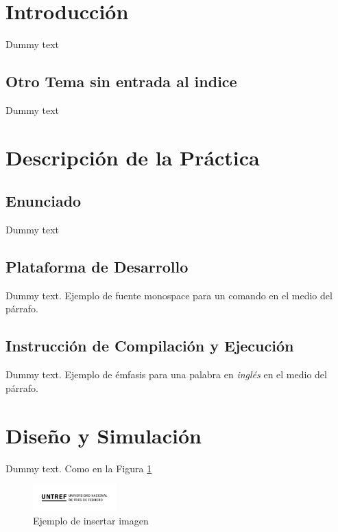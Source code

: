 \documentclass{article}
\begin{document}
\section{Introducción}
Dummy text

\subsection*{Otro Tema sin entrada al indice}
Dummy text

\section{Descripción de la Práctica}

\subsection{Enunciado}
Dummy text

\subsection{Plataforma de Desarrollo}
Dummy text. Ejemplo de fuente monospace {\ttfamily para un comando} en el medio del párrafo.

\subsection{Instrucción de Compilación y Ejecución}
Dummy text. Ejemplo de émfasis para una palabra en \textit{inglés} en el medio del párrafo.

\section{Diseño y Simulación}
Dummy text. Como en la Figura \ref{ejemplo-imagen}

\begin{figure}[h]
    \centering
    \includegraphics[height=1cm]{logo.png}
    \caption{Ejemplo de insertar imagen}
    \label{ejemplo-imagen}
\end{figure}
\clearpage 
\end{document}
